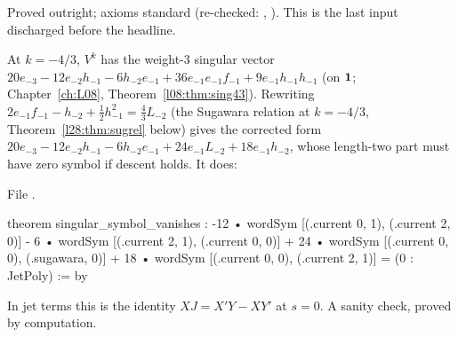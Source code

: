 \begin{status}
Proved outright; axioms standard (re-checked: , ). This is the
last input discharged before the headline.
\end{status}

\begin{example}\label{l28:ex:singular}
At $k=-4/3$, $V^k$ has the weight-3 singular vector
$20e_{-3}-12e_{-2}h_{-1}-6h_{-2}e_{-1}+36e_{-1}e_{-1}f_{-1}+9e_{-1}h_{-1}h_{-1}$ (on $\mathbf 1$; Chapter~\ref{ch:L08}, Theorem~\ref{l08:thm:sing43}).
Rewriting $2e_{-1}f_{-1}-h_{-2}+\tfrac12h_{-1}^2=\tfrac43L_{-2}$ (the Sugawara relation at $k=-4/3$, Theorem~\ref{l28:thm:sugrel} below) gives the corrected
form $20e_{-3}-12e_{-2}h_{-1}-6h_{-2}e_{-1}+24e_{-1}L_{-2}+18e_{-1}h_{-2}$, whose length-two part must have zero symbol if descent holds. It does:
\par\noindent File .
\begin{leancode}
theorem singular_symbol_vanishes :
    -12 • wordSym [(.current 0, 1), (.current 2, 0)]
      - 6 • wordSym [(.current 2, 1), (.current 0, 0)]
      + 24 • wordSym [(.current 0, 0), (.sugawara, 0)]
      + 18 • wordSym [(.current 0, 0), (.current 2, 1)] = (0 : JetPoly) := by
\end{leancode}
In jet terms this is the identity $XJ=X'Y-XY'$ at $s=0$. A sanity check, proved by computation.
\end{example}

